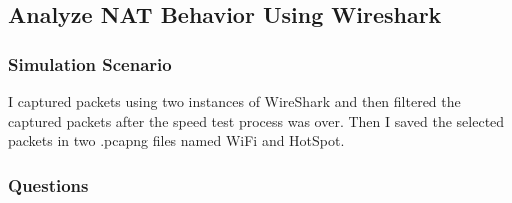 \documentclass[a4paper]{article}
\begin{document}
		\subsection{Analyze NAT Behavior Using Wireshark}
		
		\subsubsection{Simulation Scenario}
		
			I captured packets using two instances of WireShark and then filtered the captured packets after the speed test process was over. Then I saved the selected packets in two .pcapng files named WiFi and HotSpot.
		
		\pagebreak
		
		\subsubsection{Questions}
		
\end{document}
